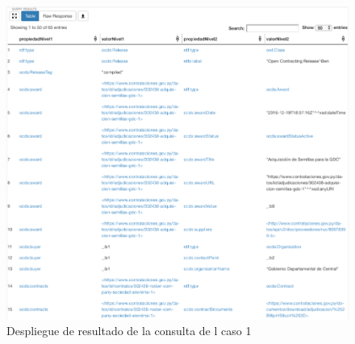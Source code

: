\begin{figure}[ht!]
    \centering
    \includegraphics[width=150mm]{figuras/caso1Resultado.png}
    \caption{Despliegue de resultado de la consulta de l caso 1}
    \label{img:caso1Resultado}
 \end{figure}
